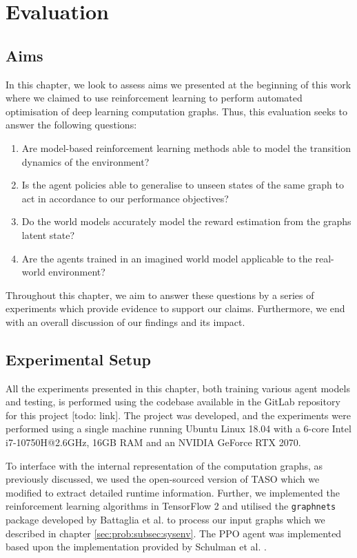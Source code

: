\chapter{Evaluation}

\section{Aims}

In this chapter, we look to assess aims we presented at the beginning of this work where we claimed to use reinforcement learning to perform automated optimisation of deep learning computation graphs. Thus, this evaluation seeks to answer the following questions:

\begin{enumerate}
  \item Are model-based reinforcement learning methods able to model the transition dynamics of the environment?
  \item Is the agent policies able to generalise to unseen states of the same graph to act in accordance to our performance objectives?
  \item Do the world models accurately model the reward estimation from the graphs latent state?
  \item Are the agents trained in an imagined world model applicable to the real-world environment?
\end{enumerate}

Throughout this chapter, we aim to answer these questions by a series of experiments which provide evidence to support our claims. Furthermore, we end with an overall discussion of our findings and its impact.

\section{Experimental Setup}

All the experiments presented in this chapter, both training various agent models and testing, is performed using the codebase available in the GitLab repository for this project [todo: link]. The project was developed, and the experiments were performed using a single machine running Ubuntu Linux 18.04 with a 6-core Intel i7-10750H@2.6GHz, 16GB RAM and an NVIDIA GeForce RTX 2070.

To interface with the internal representation of the computation graphs, as previously discussed, we used the open-sourced version of TASO \cite{jia2019taso} which we modified to extract detailed runtime information. Further, we implemented the reinforcement learning algorithms in TensorFlow 2 \cite{tensorflow2015-whitepaper} and utilised the \texttt{graph\textunderscore nets} package developed by Battaglia et al. \cite{battaglia2018relational} to process our input graphs which we described in chapter \ref{sec:prob:subsec:sysenv}. The PPO agent was implemented based upon the implementation provided by Schulman et al. \cite{schulman2017proximal}.

